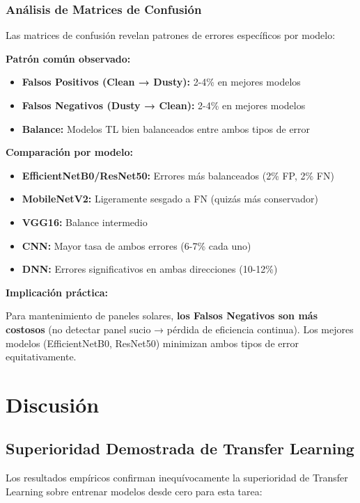 \documentclass[11pt, a4paper]{article}
\begin{document}
\subsubsection{Análisis de Matrices de Confusión}

Las matrices de confusión revelan patrones de errores específicos por modelo:

\textbf{Patrón común observado:}
\begin{itemize}
    \item \textbf{Falsos Positivos (Clean → Dusty):} 2-4\% en mejores modelos
    \item \textbf{Falsos Negativos (Dusty → Clean):} 2-4\% en mejores modelos
    \item \textbf{Balance:} Modelos TL bien balanceados entre ambos tipos de error
\end{itemize}

\textbf{Comparación por modelo:}

\begin{itemize}
    \item \textbf{EfficientNetB0/ResNet50:} Errores más balanceados (2\% FP, 2\% FN)
    \item \textbf{MobileNetV2:} Ligeramente sesgado a FN (quizás más conservador)
    \item \textbf{VGG16:} Balance intermedio
    \item \textbf{CNN:} Mayor tasa de ambos errores (6-7\% cada uno)
    \item \textbf{DNN:} Errores significativos en ambas direcciones (10-12\%)
\end{itemize}

\textbf{Implicación práctica:}

Para mantenimiento de paneles solares, \textbf{los Falsos Negativos son más costosos} (no detectar panel sucio → pérdida de eficiencia continua). Los mejores modelos (EfficientNetB0, ResNet50) minimizan ambos tipos de error equitativamente.

\section{Discusión}

\subsection{Superioridad Demostrada de Transfer Learning}

Los resultados empíricos confirman inequívocamente la superioridad de Transfer Learning sobre entrenar modelos desde cero para esta tarea:
\end{document}
